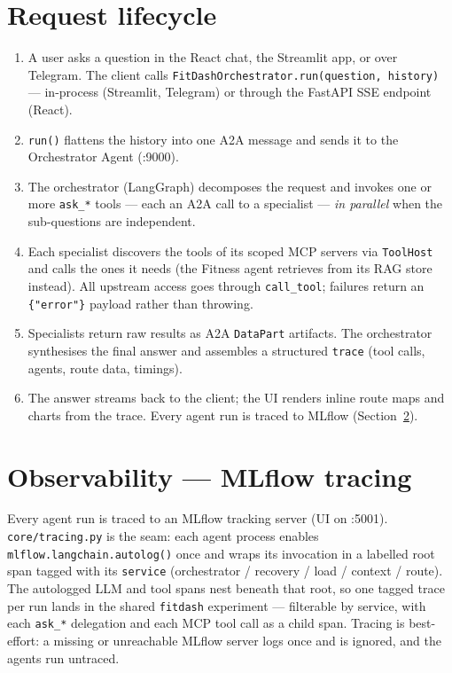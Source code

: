 \documentclass[11pt,a4paper]{article}
\newcommand{\code}[1]{{\small\texttt{#1}}}
\begin{document}
\section{Request lifecycle}
\begin{enumerate}[label=\textbf{\arabic*.}]
  \item A user asks a question in the React chat, the Streamlit app, or over Telegram. The
        client calls \code{FitDashOrchestrator.run(question, history)} --- in-process
        (Streamlit, Telegram) or through the FastAPI SSE endpoint (React).
  \item \code{run()} flattens the history into one A2A message and sends it to the
        Orchestrator Agent (:9000).
  \item The orchestrator (LangGraph) decomposes the request and invokes one or more
        \code{ask\_*} tools --- each an A2A call to a specialist --- \emph{in parallel} when the
        sub-questions are independent.
  \item Each specialist discovers the tools of its scoped MCP servers via \code{ToolHost} and
        calls the ones it needs (the Fitness agent retrieves from its RAG store instead). All
        upstream access goes through \code{call\_tool}; failures return an \code{\{"error"\}}
        payload rather than throwing.
  \item Specialists return raw results as A2A \code{DataPart} artifacts. The orchestrator
        synthesises the final answer and assembles a structured \code{trace} (tool calls,
        agents, route data, timings).
  \item The answer streams back to the client; the UI renders inline route maps and charts
        from the trace. Every agent run is traced to MLflow (Section~\ref{sec:obs}).
\end{enumerate}

\section{Observability --- MLflow tracing}\label{sec:obs}
Every agent run is traced to an MLflow tracking server (UI on :5001). \code{core/tracing.py}
is the seam: each agent process enables \code{mlflow.langchain.autolog()} once and wraps its
invocation in a labelled root span tagged with its \code{service} (orchestrator / recovery /
load / context / route). The autologged LLM and tool spans nest beneath that root, so one
tagged trace per run lands in the shared \code{fitdash} experiment --- filterable by service,
with each \code{ask\_*} delegation and each MCP tool call as a child span. Tracing is
best-effort: a missing or unreachable MLflow server logs once and is ignored, and the agents
run untraced.
\end{document}

